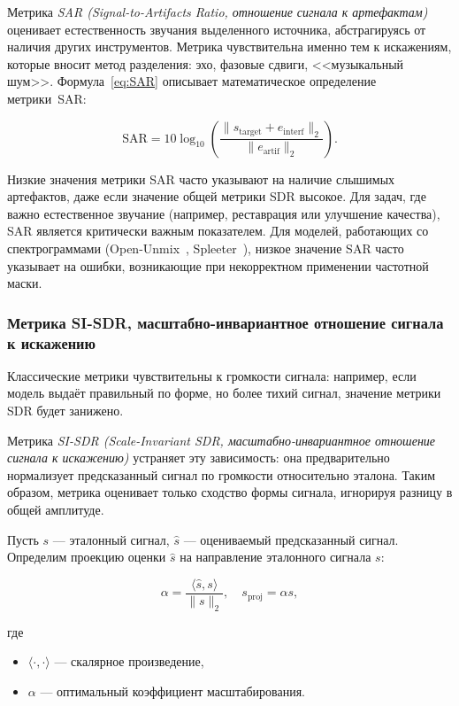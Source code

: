 \documentclass[14pt]{extarticle}
\begin{document}
\par Метрика \textit{SAR (Signal-to-Artifacts Ratio, отношение сигнала к артефактам)} оценивает естественность звучания выделенного источника, абстрагируясь от наличия других инструментов.
Метрика чувствительна именно тем к искажениям, которые вносит метод разделения: эхо, фазовые сдвиги, <<музыкальный шум>>.
Формула~\ref{eq:SAR} описывает математическое определение метрики~SAR:

\begin{equation}
	\label{eq:SAR}
    \mathrm{SAR} = 10 \log_{10} \left( \frac{\lVert s_{\mathrm{target}} + e_{\mathrm{interf}} \rVert_2}{\lVert e_{\mathrm{artif}} \rVert_2} \right).
\end{equation}

Низкие значения метрики SAR часто указывают на наличие слышимых артефактов, даже если значение общей метрики SDR высокое.
Для задач, где важно естественное звучание (например, реставрация или улучшение качества), SAR является критически важным показателем.
Для моделей, работающих со спектрограммами (Open-Unmix~\cite{openunmix}, Spleeter~\cite{Spleeter}), низкое значение SAR часто указывает на ошибки, 
возникающие при некорректном применении частотной маски.

\subsubsection{Метрика SI-SDR, масштабно-инвариантное отношение сигнала к искажению}
Классические метрики чувствительны к громкости сигнала: например, если модель выдаёт правильный по форме, но более тихий сигнал, 
значение метрики SDR будет занижено.

Метрика \textit{SI-SDR (Scale-Invariant SDR, масштабно-инвариантное отношение сигнала к искажению)} устраняет эту зависимость: она 
предварительно нормализует предсказанный сигнал по громкости относительно эталона. 
Таким образом, метрика оценивает только сходство формы сигнала, игнорируя разницу в общей амплитуде.

Пусть $s$ — эталонный сигнал, $\hat{s}$ — оцениваемый предсказанный сигнал. Определим проекцию оценки $\hat{s}$ на направление эталонного сигнала $s$:

\begin{equation*}
    \alpha = \frac{\langle \hat{s}, s \rangle}{\lVert s \rVert_2}, \quad s_{\mathrm{proj}} = \alpha s,
\end{equation*}

\noindent где
\begin{itemize}[label=$\bullet$, wide]
	\item $\langle \cdot, \cdot \rangle$ --- скалярное произведение,
	\item $\alpha$ --- оптимальный коэффициент масштабирования.
\end{itemize}
\end{document}
